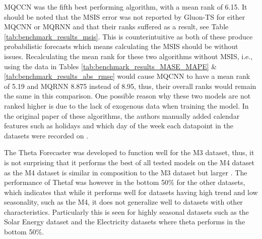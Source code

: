 MQCCN was the fifth best performing algorithm, with a mean rank of 6.15. It should be noted that the MSIS error was not reported by Gluon-TS for either MQCNN or MQRNN and that their ranks suffered as a result, see Table \ref{tab:benchmark_results_msis}. This is counterintuitive as both of these produce probabilistic forecasts which means calculating the MSIS should be without issues. Recalculating the mean rank for these two algorithms without MSIS, i.e., using the data in Tables \ref{tab:benchmark_results_MASE_MAPE} \& \ref{tab:benchmark_results_abs_rmse} would cause MQCNN to have a mean rank of 5.19 and MQRNN 8.875 instead of 8.95, thus, their overall ranks would remain the same in this comparison. One possible reason why these two models are not ranked higher is due to the lack of exogenous data when training the model. In the original paper of these algorithms, the authors manually added calendar features such as holidays and which day of the week each datapoint in the datasets were recorded on \cite{wen_multi-horizon_2018}.

The Theta Forecaster was developed to function well for the M3 dataset, thus, it is not surprising that it performs the best of all tested models on the M4 dataset as the M4 dataset is similar in composition to the M3 dataset but larger \cite{m3_vs_M4}. The performance of Thetaf was however in the bottom 50\% for the other datasets, which indicates that while it performs well for datasets having high trend and low seasonality, such as the M4,  it does not generalize well to datasets with other characteristics. Particularly this is seen for highly seasonal datasets such as the Solar Energy dataset and the Electricity datasets where theta performs in the bottom 50\%.

